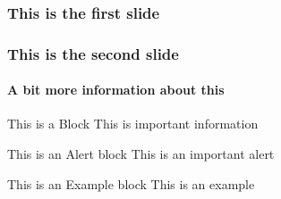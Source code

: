 \documentclass[12pt,english]{beamer}
\begin{document}
  \begin{frame}
    \frametitle{This is the first slide}
  \end{frame}
  \begin{frame}
    \frametitle{This is the second slide}
    \framesubtitle{A bit more information about this}
  \end{frame}
  
  \begin{frame}

   \begin{block}{This is a Block}
      This is important information
   \end{block}

   \begin{alertblock}{This is an Alert block}
   This is an important alert
   \end{alertblock}

   \begin{exampleblock}{This is an Example block}
   This is an example 
   \end{exampleblock}

\end{frame}
  
  
\end{document}
